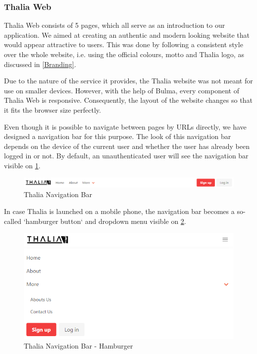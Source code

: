 \documentclass[main.tex]{subfiles}
\begin{document}
\subsubsection{Thalia Web}

Thalia Web consists of 5 pages, which all serve as an introduction to our application. We aimed at creating an authentic and modern looking website that would appear attractive to users. This was done by following a consistent style over the whole website, i.e. using the official colours, motto and Thalia logo, as discussed in \ref{Branding}.

Due to the nature of the service it provides, the Thalia website was not meant for use on smaller devices. However, with the help of Bulma, every component of Thalia Web is responsive. Consequently, the layout of the website changes so that it fits the browser size perfectly.

Even though it is possible to navigate between pages by URLs directly, we have designed a navigation bar for this purpose. The look of this navigation bar depends on the device of the current user and whether the user has already been logged in or not. By default, an unauthenticated user will see the navigation bar visible on \figurename{\ref{thalia_navbar_design}}.

\begin{figure}[H]
   \centering
   \includegraphics[width=\textwidth]{08Appendices/081User/081Pictures/navbar.png}
   \caption{Thalia Navigation Bar}
   \label{thalia_navbar_design}
\end{figure}

In case Thalia is launched on a mobile phone, the navigation bar becomes a so-called `hamburger button` and dropdown menu visible on \figurename{\ref{thalia_navbar_hamburger_design}}.

\begin{figure}[H]
   \centering
   \includegraphics[width=\textwidth]{08Appendices/081User/081Pictures/navbar_hamburger.png}
   \caption{Thalia Navigation Bar - Hamburger}
   \label{thalia_navbar_hamburger_design}
\end{figure}
\end{document}
